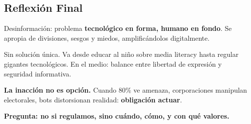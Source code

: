 \subsection{Reflexión Final}

Desinformación: problema \textbf{tecnológico en forma, humano en fondo}. Se apropia de divisiones, sesgos y miedos, amplificándolos digitalmente.

Sin solución única. Va desde educar al niño sobre media literacy hasta regular gigantes tecnológicos. En el medio: balance entre libertad de expresión y seguridad informativa.

\textbf{La inacción no es opción.} Cuando 80\% ve amenaza, corporaciones manipulan electorales, bots distorsionan realidad: \textbf{obligación actuar}.

\textbf{Pregunta: no si regulamos, sino cuándo, cómo, y con qué valores.}
